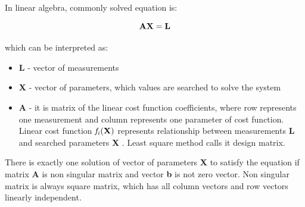 \documentclass[a4paper,12pt]{article}
\newcommand{\ematr}[1]{
{\bf #1}
}
\newcommand{\evect}[1]{
{\bf #1}
}
\newcommand{\efunc}[1]{
{\it #1}
}
\newcommand{\term}[1]{
{\it #1}
}
\begin{document}
In linear algebra, commonly solved equation is:

\begin{equation}
\label{eq:linear_eq}
\ematr{A}\evect{X} = \evect{L} 
\end{equation} 



which can be interpreted as:
\begin{itemize}
\item \evect{L} - vector of measurements
\item \evect{X} - vector of parameters, which values are searched to solve the system
\item \ematr{A} - it is matrix of the linear cost function  coefficients,  where row represents one measurement 
		  and column represents one parameter of cost function. Linear cost function $\efunc{f_{i}(\evect{X})}$
		  represents relationship between measurements \evect{L} and searched parameters \evect{X}. 
		  Least square method calls it design matrix. 
\end{itemize}


There is exactly one solution 
of vector of parameters  \evect{X} to satisfy the equation if matrix \ematr{A} is 
non singular matrix  and vector \evect{b} is not zero vector. Non singular matrix is always square matrix, 
which has all column vectors and row vectors linearly independent. 

\end{document}
